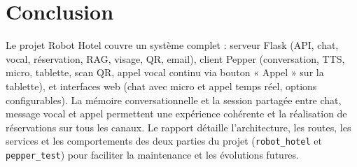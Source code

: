 \documentclass[12pt,a4paper]{article}
\begin{document}
\section{Conclusion}

Le projet Robot Hotel couvre un système complet : serveur Flask (API, chat, vocal, réservation, RAG, visage, QR, email), client Pepper (conversation, TTS, micro, tablette, scan QR, appel vocal continu via bouton « Appel » sur la tablette), et interfaces web (chat avec micro et appel temps réel, options configurables). La mémoire conversationnelle et la session partagée entre chat, message vocal et appel permettent une expérience cohérente et la réalisation de réservations sur tous les canaux. Le rapport détaille l’architecture, les routes, les services et les comportements des deux parties du projet (\texttt{robot\_hotel} et \texttt{pepper\_test}) pour faciliter la maintenance et les évolutions futures.
\end{document}
